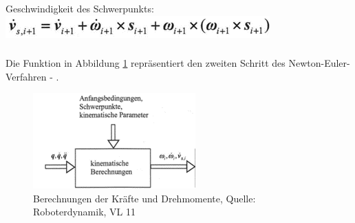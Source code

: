 Geschwindigkeit des Schwerpunkts: \includegraphics[width=0.63\linewidth]{grafic/vs_dot_gleichung}



\subsubsection{}

Die Funktion in Abbildung \ref{fig:sensoren_subsystem_foo} repräsentiert den zweiten Schritt des Newton-Euler-Verfahren - .

\begin{figure}[!htbp]
	\centering
	\includegraphics[width=0.43\linewidth]{grafic/compute_kinematics_diagramm}
	\caption{Berechnungen der Kräfte und Drehmomente, Quelle: Roboterdynamik, VL 11}
	\label{fig:sensoren_subsystem_foo}
\end{figure}


